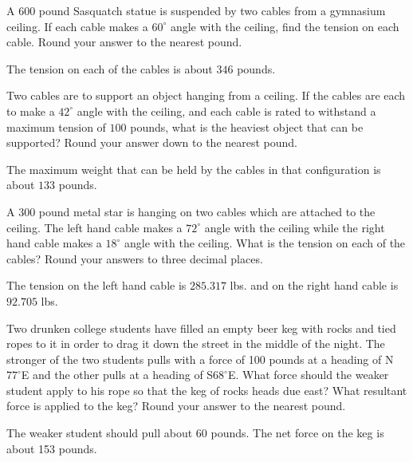\documentclass{ximera}
\begin{document}
\begin{problem}
A $600$ pound Sasquatch statue is suspended by two cables from a gymnasium ceiling.  If  each cable makes a $60^{\circ}$ angle with the ceiling, find the tension on each cable.  Round your answer to the nearest pound.

\begin{solution}
The tension on each of the cables is about $346$ pounds.
\end{solution}
\end{problem}

\begin{problem}
Two cables are to support an object hanging from a ceiling.  If the cables are each to make a $42^{\circ}$ angle with the ceiling, and each cable is rated to withstand a maximum tension of $100$ pounds, what is the heaviest object that can be supported?  Round your answer down to the nearest pound.

\begin{solution}
The maximum weight that can be held by the cables in that configuration is about $133$ pounds.
\end{solution}
\end{problem}

\begin{problem}
A $300$ pound metal star is hanging on two cables which are attached to the ceiling.  The left hand cable makes a $72^{\circ}$ angle with the ceiling while the right hand cable makes a $18^{\circ}$ angle with the ceiling.  What is the tension on each of the cables?  Round your answers to three decimal places.

\begin{solution}
The tension on the left hand cable is $285.317$ lbs. and on the right hand cable is $92.705$ lbs.
\end{solution}
\end{problem}

\begin{problem} \label{kegpull}
Two drunken college students have filled an empty beer keg with rocks and tied ropes to it in order to drag it down the street in the middle of the night.  The stronger of the two students pulls with a force of 100 pounds at a heading of N$77^{\circ}$E and the other pulls at a heading of S$68^{\circ}$E.  What force should the weaker student apply to his rope so that the keg of rocks heads due east?  What resultant force is applied to the keg?  Round your answer to the nearest pound.

\begin{solution}
The weaker student should pull about 60 pounds.  The net force on the keg is about 153 pounds.
\end{solution}
\end{problem}
\end{document}
